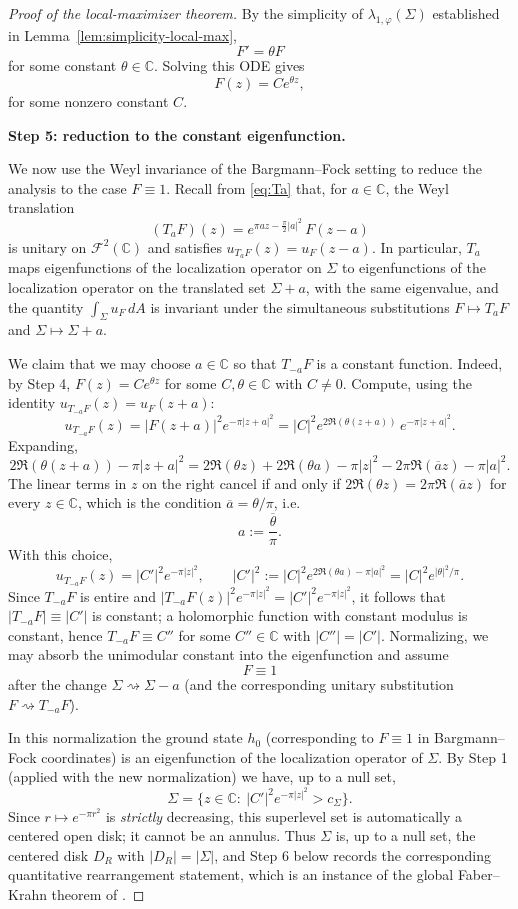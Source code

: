 \documentclass[a4paper,11pt,reqno]{amsart}
\numberwithin{equation}{section}
\theoremstyle{plain} %
\theoremstyle{definition} %
\theoremstyle{remark}
\newcommand{\C}{\mathbb{C}}
\begin{document}
\begin{proof}[Proof of the local-maximizer theorem]
By the simplicity of \(\lambda_{1,\varphi}(\Sigma)\) established in
Lemma~\ref{lem:simplicity-local-max},
\[
F'=\theta F
\]
for some constant \(\theta\in \C\). Solving this ODE gives
\[
F(z)=C e^{\theta z},
\]
for some nonzero constant \(C\).

\medskip
\noindent
{\bf Step 5: reduction to the constant eigenfunction.}

We now use the Weyl invariance of the Bargmann--Fock setting to reduce the
analysis to the case \(F\equiv 1\). Recall from \eqref{eq:Ta} that, for
\(a\in\C\), the Weyl translation
\[
(T_a F)(z)= e^{\pi a z-\frac{\pi}{2}|a|^2}\,F(z-a)
\]
is unitary on \(\mathcal F^2(\C)\) and satisfies
\(u_{T_aF}(z)=u_F(z-a)\). In particular, \(T_a\) maps eigenfunctions of the
localization operator on \(\Sigma\) to eigenfunctions of the localization
operator on the translated set \(\Sigma+a\), with the same eigenvalue, and the
quantity \(\int_\Sigma u_F\,dA\) is invariant under the simultaneous
substitutions \(F\mapsto T_aF\) and \(\Sigma\mapsto \Sigma+a\).

We claim that we may choose \(a\in\C\) so that \(T_{-a}F\) is a constant
function. Indeed, by Step 4, \(F(z)=Ce^{\theta z}\) for some \(C,\theta\in\C\)
with \(C\ne 0\). Compute, using the identity
\(u_{T_{-a}F}(z)=u_F(z+a)\):
\[
u_{T_{-a}F}(z)=|F(z+a)|^2 e^{-\pi|z+a|^2}
=|C|^2 e^{2\Re(\theta(z+a))}\,e^{-\pi|z+a|^2}.
\]
Expanding,
\[
2\Re(\theta(z+a))-\pi|z+a|^2
=
2\Re(\theta z)+2\Re(\theta a)-\pi|z|^2-2\pi\Re(\overline a z)-\pi|a|^2.
\]
The linear terms in \(z\) on the right cancel if and only if
\(2\Re(\theta z)=2\pi\Re(\overline a z)\) for every \(z\in\C\), which is the
condition \(\overline a=\theta/\pi\), i.e.
\[
a:=\frac{\overline\theta}{\pi}.
\]
With this choice,
\[
u_{T_{-a}F}(z)=|C'|^2 e^{-\pi|z|^2},
\qquad
|C'|^2:=|C|^2 e^{2\Re(\theta a)-\pi|a|^2}=|C|^2 e^{|\theta|^2/\pi}.
\]
Since \(T_{-a}F\) is entire and \(|T_{-a}F(z)|^2 e^{-\pi|z|^2}=|C'|^2
e^{-\pi|z|^2}\), it follows that \(|T_{-a}F|\equiv|C'|\) is constant; a
holomorphic function with constant modulus is constant, hence
\(T_{-a}F\equiv C''\) for some \(C''\in\C\) with \(|C''|=|C'|\). Normalizing,
we may absorb the unimodular constant into the eigenfunction and assume
\[
F\equiv 1
\]
after the change \(\Sigma\rightsquigarrow \Sigma-a\) (and the corresponding
unitary substitution \(F\rightsquigarrow T_{-a}F\)).

In this normalization the ground state \(h_0\) (corresponding to
\(F\equiv 1\) in Bargmann--Fock coordinates) is an eigenfunction of the
localization operator of \(\Sigma\). By Step 1 (applied with the new
normalization) we have, up to a null set,
\[
\Sigma=\{z\in\C:\ |C'|^2 e^{-\pi |z|^2}>c_\Sigma\}.
\]
Since \(r\mapsto e^{-\pi r^2}\) is \emph{strictly} decreasing, this
superlevel set is automatically a centered open disk; it cannot be an
annulus. Thus \(\Sigma\) is, up to a null set, the centered disk \(D_R\)
with \(|D_R|=|\Sigma|\), and Step 6 below records the corresponding
quantitative rearrangement statement, which is an instance of the global
Faber--Krahn theorem of \cite{Nicola-Tilli}.


\end{proof}
\end{document}
